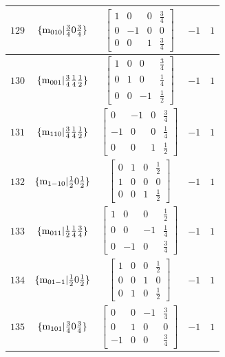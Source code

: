 \documentclass[fleqn,8pt]{jsarticle}
\begin{document}
\begin{longtable}{ccccc}
$ 129 $ & $ \{{\rm m}_{010}|\frac{3}{4} 0 \frac{3}{4}\} $ & $ \begin{bmatrix} 1 & 0 & 0 & \frac{3}{4} \\ 0 & -1 & 0 & 0 \\ 0 & 0 & 1 & \frac{3}{4} \end{bmatrix} $ & $ -1 $ & $ 1 $ \\ \hline
$ 130 $ & $ \{{\rm m}_{001}|\frac{3}{4} \frac{1}{4} \frac{1}{2}\} $ & $ \begin{bmatrix} 1 & 0 & 0 & \frac{3}{4} \\ 0 & 1 & 0 & \frac{1}{4} \\ 0 & 0 & -1 & \frac{1}{2} \end{bmatrix} $ & $ -1 $ & $ 1 $ \\ \hline
$ 131 $ & $ \{{\rm m}_{110}|\frac{3}{4} \frac{1}{4} \frac{1}{2}\} $ & $ \begin{bmatrix} 0 & -1 & 0 & \frac{3}{4} \\ -1 & 0 & 0 & \frac{1}{4} \\ 0 & 0 & 1 & \frac{1}{2} \end{bmatrix} $ & $ -1 $ & $ 1 $ \\ \hline
$ 132 $ & $ \{{\rm m}_{1-10}|\frac{1}{2} 0 \frac{1}{2}\} $ & $ \begin{bmatrix} 0 & 1 & 0 & \frac{1}{2} \\ 1 & 0 & 0 & 0 \\ 0 & 0 & 1 & \frac{1}{2} \end{bmatrix} $ & $ -1 $ & $ 1 $ \\ \hline
$ 133 $ & $ \{{\rm m}_{011}|\frac{1}{2} \frac{1}{4} \frac{3}{4}\} $ & $ \begin{bmatrix} 1 & 0 & 0 & \frac{1}{2} \\ 0 & 0 & -1 & \frac{1}{4} \\ 0 & -1 & 0 & \frac{3}{4} \end{bmatrix} $ & $ -1 $ & $ 1 $ \\ \hline
$ 134 $ & $ \{{\rm m}_{01-1}|\frac{1}{2} 0 \frac{1}{2}\} $ & $ \begin{bmatrix} 1 & 0 & 0 & \frac{1}{2} \\ 0 & 0 & 1 & 0 \\ 0 & 1 & 0 & \frac{1}{2} \end{bmatrix} $ & $ -1 $ & $ 1 $ \\ \hline
$ 135 $ & $ \{{\rm m}_{101}|\frac{3}{4} 0 \frac{3}{4}\} $ & $ \begin{bmatrix} 0 & 0 & -1 & \frac{3}{4} \\ 0 & 1 & 0 & 0 \\ -1 & 0 & 0 & \frac{3}{4} \end{bmatrix} $ & $ -1 $ & $ 1 $ \\ \hline

\end{longtable}
\end{document}

